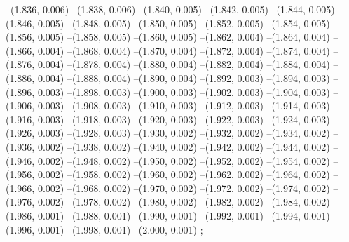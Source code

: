--(1.836, 0.006)
--(1.838, 0.006)
--(1.840, 0.005)
--(1.842, 0.005)
--(1.844, 0.005)
--(1.846, 0.005)
--(1.848, 0.005)
--(1.850, 0.005)
--(1.852, 0.005)
--(1.854, 0.005)
--(1.856, 0.005)
--(1.858, 0.005)
--(1.860, 0.005)
--(1.862, 0.004)
--(1.864, 0.004)
--(1.866, 0.004)
--(1.868, 0.004)
--(1.870, 0.004)
--(1.872, 0.004)
--(1.874, 0.004)
--(1.876, 0.004)
--(1.878, 0.004)
--(1.880, 0.004)
--(1.882, 0.004)
--(1.884, 0.004)
--(1.886, 0.004)
--(1.888, 0.004)
--(1.890, 0.004)
--(1.892, 0.003)
--(1.894, 0.003)
--(1.896, 0.003)
--(1.898, 0.003)
--(1.900, 0.003)
--(1.902, 0.003)
--(1.904, 0.003)
--(1.906, 0.003)
--(1.908, 0.003)
--(1.910, 0.003)
--(1.912, 0.003)
--(1.914, 0.003)
--(1.916, 0.003)
--(1.918, 0.003)
--(1.920, 0.003)
--(1.922, 0.003)
--(1.924, 0.003)
--(1.926, 0.003)
--(1.928, 0.003)
--(1.930, 0.002)
--(1.932, 0.002)
--(1.934, 0.002)
--(1.936, 0.002)
--(1.938, 0.002)
--(1.940, 0.002)
--(1.942, 0.002)
--(1.944, 0.002)
--(1.946, 0.002)
--(1.948, 0.002)
--(1.950, 0.002)
--(1.952, 0.002)
--(1.954, 0.002)
--(1.956, 0.002)
--(1.958, 0.002)
--(1.960, 0.002)
--(1.962, 0.002)
--(1.964, 0.002)
--(1.966, 0.002)
--(1.968, 0.002)
--(1.970, 0.002)
--(1.972, 0.002)
--(1.974, 0.002)
--(1.976, 0.002)
--(1.978, 0.002)
--(1.980, 0.002)
--(1.982, 0.002)
--(1.984, 0.002)
--(1.986, 0.001)
--(1.988, 0.001)
--(1.990, 0.001)
--(1.992, 0.001)
--(1.994, 0.001)
--(1.996, 0.001)
--(1.998, 0.001)
--(2.000, 0.001)
;
